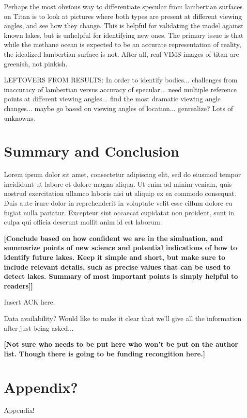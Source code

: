 \documentclass[twocolumn,linenumbers]{aastex631}
\begin{document}
Perhaps the most obvious way to differentiate specular from lambertian surfaces on Titan is to look at pictures where both types are present at different viewing angles, and see how they change. This is helpful for validating the model against known lakes, but is unhelpful for identifying new ones. The primary issue is that while the methane ocean is expected to be an accurate representation of reality, the idealized lambertian surface is not. After all, real VIMS images of titan are greenish, not pinkish. 

\color{blue} LEFTOVERS FROM RESULTS: In order to identify bodies... challenges from inaccuracy of lambertian versus accuracy of specular... need multiple reference points at different viewing angles... find the most dramatic viewing angle changes... maybe go based on viewing angles of location... genrealize? Lots of unknowns. \color{black}

\section{Summary and Conclusion} \label{sec:conclusion}

Lorem ipsum dolor sit amet, consectetur adipiscing elit, sed do eiusmod tempor incididunt ut labore et dolore magna aliqua. Ut enim ad minim veniam, quis nostrud exercitation ullamco laboris nisi ut aliquip ex ea commodo consequat. Duis aute irure dolor in reprehenderit in voluptate velit esse cillum dolore eu fugiat nulla pariatur. Excepteur sint occaecat cupidatat non proident, sunt in culpa qui officia deserunt mollit anim id est laborum. 

\textbf{\color{red}[Conclude based on how confident we are in the simluation, and summarize points of new science and potential indications of how to identify future lakes. Keep it simple and short, but make sure to include relevant details, such as precise values that can be used to detect lakes. Summary of most important points is simply helpful to readers]]\color{black}}

\begin{acknowledgments}
Insert ACK here. 

\color{blue}Data availability? Would like to make it clear that we'll give all the information after just being asked...\color{black}

\textbf{\color{red}[Not sure who needs to be put here who won't be put on the author list. Though there is going to be funding recongition here.]\color{black}}
\end{acknowledgments}

\appendix

\section{Appendix?}

Appendix!

{}

\end{document}
